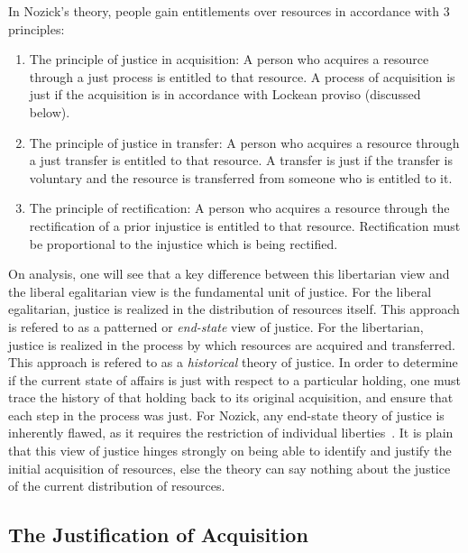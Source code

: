 In Nozick's theory, people gain entitlements over resources in accordance with
3 principles:
\begin{enumerate}
    \item The principle of justice in acquisition: A person who acquires a
          resource through a just process is entitled to that resource.
          A process of acquisition is just if the acquisition is in accordance
          with Lockean proviso (discussed below).
    \item The principle of justice in transfer: A person who acquires a resource
          through a just transfer is entitled to that resource. A transfer is 
          just if the transfer is voluntary and the resource is transferred
          from someone who is entitled to it.
    \item The principle of rectification: A person who acquires a resource
          through the rectification of a prior injustice is entitled to that
          resource. Rectification must be proportional to the injustice which
          is being rectified.
\end{enumerate}

On analysis, one will see that a key difference between this libertarian view
and the liberal egalitarian view is the fundamental unit of justice. For the 
liberal egalitarian, justice is realized in the distribution of resources
itself. This approach is refered to as a patterned or \textit{end-state} view of justice.
For the libertarian, justice is realized in the process by which resources are
acquired and transferred. This approach is refered to as a \textit{historical} theory of
justice. In order to determine if the current state of affairs is just with 
respect to a particular holding, one must trace the history of that holding
back to its original acquisition, and ensure that each step in the process was
just. For Nozick, any end-state theory of justice is inherently flawed, as it 
requires the restriction of individual liberties~\cite{Henberg_1977}. It is
plain that this view of justice hinges strongly on being able to identify and
justify the initial acquisition of resources, else the theory can say nothing 
about the justice of the current distribution of resources.

\subsection{The Justification of Acquisition}

